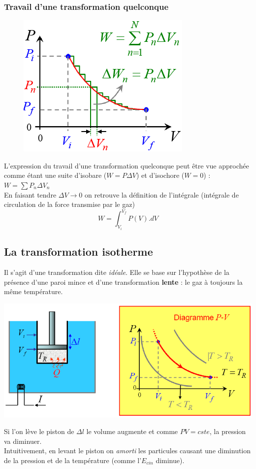 \documentclass	[11pt, a4paper, openany]{book}
\begin{document}
\subsubsection{Travail d'une transformation quelconque}
\begin{figure}
\includegraphics[scale=0.34]{th/image12.png}
\end{figure}
L'expression du travail d'une transformation quelconque peut être vue approchée comme étant une suite d'isobare ($W = P\Delta V$) et d'isochore ($W = 0$) : $W = \sum P_n \Delta V_n$\\ En faisant tendre $\Delta V \rightarrow 0$ on retrouve la définition de l'intégrale (intégrale de circulation de la force transmise par le gaz)
\begin{equation}
W = \int_{V_i}^{V_f} P(V).dV
\end{equation}
\subsection{La transformation isotherme}
Il s'agit d'une transformation dite \textit{idéale}. Elle se base sur l'hypothèse de la présence d'une paroi mince et d'une transformation \textbf{lente} : le gaz à toujours la même température. 
\begin{center}
\includegraphics[scale=0.3]{th/image13.png}
\end{center}
Si l'on lève le piston de $\Delta l$ le volume augmente et comme $PV=cste$, la pression va diminuer.\\
Intuitivement, en levant le piston on \textit{amorti} les particules causant une diminution de la pression et de la température (comme l'$E_{cin}$ diminue).
\end{document}
